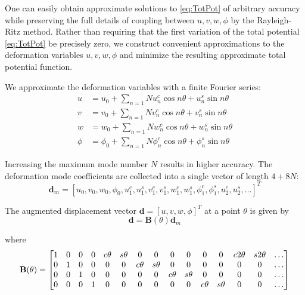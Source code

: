 \documentclass[\rootdir/thesis.tex]{subfiles}
\begin{document}
One can easily obtain approximate solutions to \eqref{eq:TotPot} of arbitrary accuracy while preserving the full details of coupling between $u,v,w,\phi$ by the Rayleigh-Ritz method. Rather than requiring that the first variation of the total potential \eqref{eq:TotPot} be precisely zero, we construct convenient approximations to the deformation variables $u,v,w,\phi$ and minimize the resulting approximate total potential function.

We approximate the deformation variables with a finite Fourier series:
\begin{align}
\label{eq:mm_FourierDef}
u &= u_0 + \sum_{n=1}{N} u_n^c \cos{n\theta} + u_n^s \sin{n\theta}\\
v &= v_0 + \sum_{n=1}{N} v_n^c \cos{n\theta} + v_n^s \sin{n\theta}\\
w &= w_0 + \sum_{n=1}{N} w_n^c \cos{n\theta} + w_n^s \sin{n\theta}\\
\phi &= \phi_0 + \sum_{n=1}{N} \phi_n^c \cos{n\theta} + \phi_n^s \sin{n\theta}
\end{align}

Increasing the maximum mode number $N$ results in higher accuracy. The deformation mode coefficients are collected into a single vector of length $4+8N$:
\begin{equation}
\mathbf{d}_m = [u_0,v_0,w_0,\phi_0,u_1^c,u_1^s,v_1^c,v_1^s,w_1^c,w_1^s,\phi_1^c,\phi_1^s,u_2^c,u_2^s,\dots]^T
\end{equation}

The augmented displacement vector $\mathbf{d}=[u,v,w,\phi]^T$ at a point $\theta$ is given by
\begin{equation}
\label{eq:u_Bd}
\mathbf{d} = \mathbf{B}(\theta)\mathbf{d}_m
\end{equation}

where
\begin{equation}
\setcounter{MaxMatrixCols}{16}
\mathbf{B}(\theta) =
\begin{bmatrix}
1 & 0 & 0 & 0 & c\theta & s\theta & 0 & 0 & 0 & 0 & 0 & 0 & c2\theta & s2\theta & \dots\\
0 & 1 & 0 & 0 & 0 & 0 & c\theta & s\theta & 0 & 0 & 0 & 0 & 0 & 0 & \dots\\
0 & 0 & 1 & 0 & 0 & 0 & 0 & 0 & c\theta & s\theta & 0 & 0 & 0 & 0 & \dots\\
0 & 0 & 0 & 1 & 0 & 0 & 0 & 0 & 0 & 0 & c\theta & s\theta & 0 & 0 & \dots
\end{bmatrix}
\end{equation}
\end{document}
